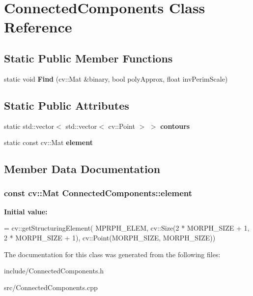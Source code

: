 \hypertarget{classConnectedComponents}{}\section{Connected\+Components Class Reference}
\label{classConnectedComponents}
\subsection*{Static Public Member Functions}
\begin{DoxyCompactItemize}
\item 
\hypertarget{classConnectedComponents_ad59d9b6bc16ad0b2c37552c5b236aade}{}static void {\bfseries Find} (cv\+::\+Mat \&binary, bool poly\+Approx, float inv\+Perim\+Scale)\label{classConnectedComponents_ad59d9b6bc16ad0b2c37552c5b236aade}

\end{DoxyCompactItemize}
\subsection*{Static Public Attributes}
\begin{DoxyCompactItemize}
\item 
\hypertarget{classConnectedComponents_ae8f2cf051af196924705311ab181d661}{}static std\+::vector$<$ std\+::vector$<$ cv\+::\+Point $>$ $>$ {\bfseries contours}\label{classConnectedComponents_ae8f2cf051af196924705311ab181d661}

\item 
static const cv\+::\+Mat {\bfseries element}
\end{DoxyCompactItemize}


\subsection{Member Data Documentation}
\hypertarget{classConnectedComponents_a7620c576b46a91864d30a6b2ab56eedb}{}
\subsubsection[{element}]{\setlength{\rightskip}{0pt plus 5cm}const cv\+::\+Mat Connected\+Components\+::element\hspace{0.3cm}{\ttfamily [static]}}\label{classConnectedComponents_a7620c576b46a91864d30a6b2ab56eedb}
{\bfseries Initial value\+:}
\begin{DoxyCode}
= cv::getStructuringElement(
    MPRPH\_ELEM, 
    cv::Size(2 * MORPH\_SIZE + 1, 2 * MORPH\_SIZE + 1), 
    cv::Point(MORPH\_SIZE, MORPH\_SIZE))
\end{DoxyCode}


The documentation for this class was generated from the following files\+:\begin{DoxyCompactItemize}
\item 
include/Connected\+Components.\+h\item 
src/Connected\+Components.\+cpp\end{DoxyCompactItemize}
